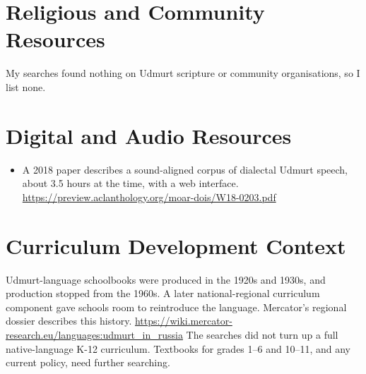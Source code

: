 \documentclass[12pt]{article}
\begin{document}
\section{Religious and Community Resources}
My searches found nothing on Udmurt scripture or community organisations, so I list none.

\section{Digital and Audio Resources}
\begin{itemize}
\item A 2018 paper describes a sound-aligned corpus of dialectal Udmurt speech, about 3.5 hours at the time, with a web interface. \url{https://preview.aclanthology.org/moar-dois/W18-0203.pdf}
\end{itemize}

\section{Curriculum Development Context}
Udmurt-language schoolbooks were produced in the 1920s and 1930s, and production stopped from the 1960s. A later national-regional curriculum component gave schools room to reintroduce the language. Mercator's regional dossier describes this history. \url{https://wiki.mercator-research.eu/languages:udmurt_in_russia}
The searches did not turn up a full native-language K-12 curriculum. Textbooks for grades 1--6 and 10--11, and any current policy, need further searching.
\end{document}
